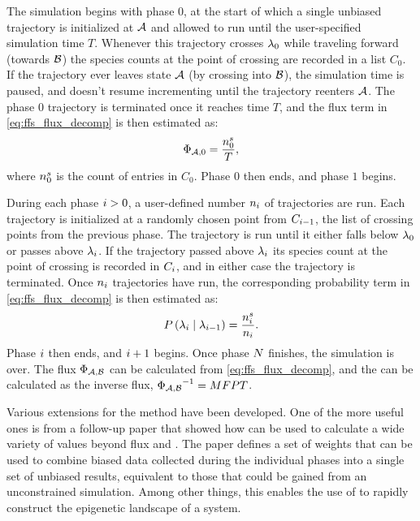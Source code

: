 The simulation begins with phase $0$, at the start of which a single unbiased trajectory is initialized at $\mathcal{A}$ and allowed to run until the user-specified simulation time $T$. Whenever this trajectory crosses ${\lambda}_{0}$ while traveling forward (\ie towards $\mathcal{B}$) the species counts at the point of crossing are recorded in a list $C_0$. If the trajectory ever leaves state $\mathcal{A}$ (\eg by crossing into $\mathcal{B}$), the simulation time is paused, and doesn't resume incrementing until the trajectory reenters $\mathcal{A}$. The phase $0$ trajectory is terminated once it reaches time $T$, and the flux term in \eqref{eq:ffs_flux_decomp} is then estimated as:
\begin{equation*}
    \Phi_{\mathcal{A}, 0} = \frac{n_{0}^{s}}{T},
\end{equation*}
where $n_{0}^{s}$ is the count of entries in $C_0$. Phase $0$ then ends, and phase $1$ begins.

During each phase $i>0$, a user-defined number $n_{i}$ of trajectories are run. Each trajectory is initialized at a randomly chosen point from $C_{i-1}$, the list of crossing points from the previous phase. The trajectory is run until it either falls below ${\lambda}_{0}$ or passes above ${\lambda}_{i}$. If the trajectory passed above ${\lambda}_{i}$ its species count at the point of crossing is recorded in $C_{i}$, and in either case the trajectory is terminated. Once $n_{i}$ trajectories have run, the corresponding probability term in \eqref{eq:ffs_flux_decomp} is then estimated as:
\begin{equation*}
    P\left(  {\lambda}_{i} \mid {\lambda}_{i - 1}  \right) = \frac{n_{i}^{s}}{n_{i}}.
\end{equation*}
Phase $i$ then ends, and $i+1$ begins. Once phase $N$ finishes, the  simulation is over. The flux $\Phi_{\mathcal{A}, \mathcal{B}}$ can be calculated from \eqref{eq:ffs_flux_decomp}, and the  can be calculated as the inverse flux, ${\Phi_{\mathcal{A}, \mathcal{B}}}^{-1} = MFPT$.

Various extensions for the  method have been developed. One of the more useful ones is from a follow-up paper\supercite{Valeriani:2007hv} that showed how  can be used to calculate a wide variety of values beyond flux and . The paper defines a set of weights that can be used to combine biased data collected during the individual phases into a single set of unbiased results, equivalent to those that could be gained from an unconstrained  simulation. Among other things, this enables the use of  to rapidly construct the epigenetic landscape of a system.

